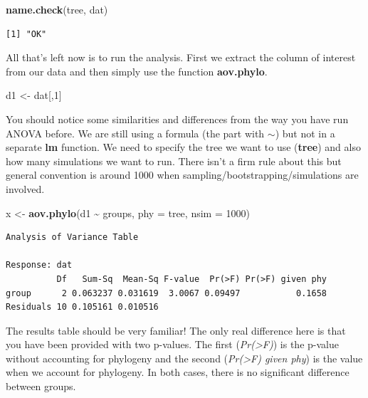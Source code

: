 \documentclass[
]{book}
\newenvironment{Shaded}{\begin{snugshade}}{\end{snugshade}}
\newcommand{\DataTypeTok}[1]{\textcolor[rgb]{0.13,0.29,0.53}{#1}}
\newcommand{\DecValTok}[1]{\textcolor[rgb]{0.00,0.00,0.81}{#1}}
\newcommand{\KeywordTok}[1]{\textcolor[rgb]{0.13,0.29,0.53}{\textbf{#1}}}
\newcommand{\NormalTok}[1]{#1}
\newcommand{\OperatorTok}[1]{\textcolor[rgb]{0.81,0.36,0.00}{\textbf{#1}}}
\newcommand{\StringTok}[1]{\textcolor[rgb]{0.31,0.60,0.02}{#1}}
\begin{document}
\begin{Shaded}
\begin{Highlighting}[]
\KeywordTok{name.check}\NormalTok{(tree, dat)}
\end{Highlighting}
\end{Shaded}

\begin{verbatim}
[1] "OK"
\end{verbatim}

All that's left now is to run the analysis. First we extract the column of interest from our data and then simply use the function \textbf{aov.phylo}.

\begin{Shaded}
\begin{Highlighting}[]
\NormalTok{d1 \textless{}{-}}\StringTok{ }\NormalTok{dat[,}\DecValTok{1}\NormalTok{]}
\end{Highlighting}
\end{Shaded}

You should notice some similarities and differences from the way you have run ANOVA before. We are still using a formula (the part with \(\sim\)) but not in a separate \textbf{lm} function. We need to specify the tree we want to use (\textbf{tree}) and also how many simulations we want to run. There isn't a firm rule about this but general convention is around 1000 when sampling/bootstrapping/simulations are involved.

\begin{Shaded}
\begin{Highlighting}[]
\NormalTok{x \textless{}{-}}\StringTok{ }\KeywordTok{aov.phylo}\NormalTok{(d1 }\OperatorTok{\textasciitilde{}}\StringTok{ }\NormalTok{groups, }\DataTypeTok{phy =}\NormalTok{ tree, }\DataTypeTok{nsim =} \DecValTok{1000}\NormalTok{)}
\end{Highlighting}
\end{Shaded}

\begin{verbatim}
Analysis of Variance Table

Response: dat
          Df   Sum-Sq  Mean-Sq F-value  Pr(>F) Pr(>F) given phy
group      2 0.063237 0.031619  3.0067 0.09497           0.1658
Residuals 10 0.105161 0.010516                                 
\end{verbatim}

The results table should be very familiar! The only real difference here is that you have been provided with two p-values. The first (\emph{Pr(\textgreater F)}) is the p-value without accounting for phylogeny and the second (\emph{Pr(\textgreater F) given phy}) is the value when we account for phylogeny. In both cases, there is no significant difference between groups.
\end{document}
